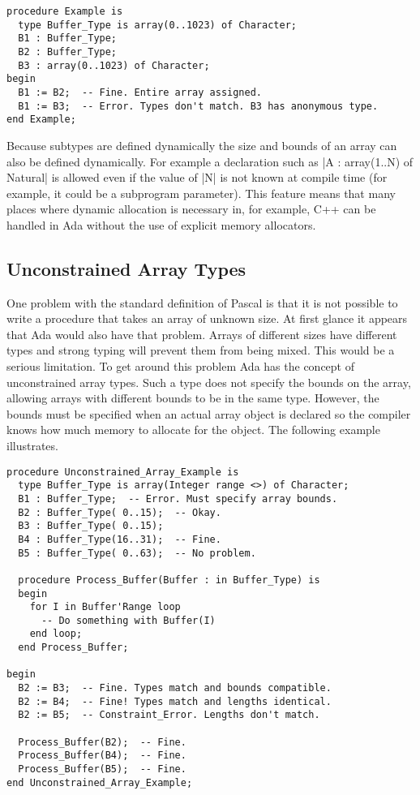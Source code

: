 \begin{lstlisting}
procedure Example is
  type Buffer_Type is array(0..1023) of Character;
  B1 : Buffer_Type;
  B2 : Buffer_Type;
  B3 : array(0..1023) of Character;
begin
  B1 := B2;  -- Fine. Entire array assigned.
  B1 := B3;  -- Error. Types don't match. B3 has anonymous type.
end Example;
\end{lstlisting}

Because subtypes are defined dynamically the size and bounds of an array can also be defined
dynamically. For example a declaration such as |A : array(1..N) of Natural| is allowed even if
the value of |N| is not known at compile time (for example, it could be a subprogram parameter).
This feature means that many places where dynamic allocation is necessary in, for example, C++
can be handled in Ada without the use of explicit memory allocators.

\subsection{Unconstrained Array Types}

One problem with the standard definition of Pascal is that it is not possible to write a
procedure that takes an array of unknown size. At first glance it appears that Ada would also
have that problem. Arrays of different sizes have different types and strong typing will prevent
them from being mixed. This would be a serious limitation. To get around this problem Ada has
the concept of unconstrained array types. Such a type does not specify the bounds on the array,
allowing arrays with different bounds to be in the same type. However, the bounds must be
specified when an actual array object is declared so the compiler knows how much memory to
allocate for the object. The following example illustrates.

\begin{lstlisting}
procedure Unconstrained_Array_Example is
  type Buffer_Type is array(Integer range <>) of Character;
  B1 : Buffer_Type;  -- Error. Must specify array bounds.
  B2 : Buffer_Type( 0..15);  -- Okay.
  B3 : Buffer_Type( 0..15);
  B4 : Buffer_Type(16..31);  -- Fine.
  B5 : Buffer_Type( 0..63);  -- No problem.

  procedure Process_Buffer(Buffer : in Buffer_Type) is
  begin
    for I in Buffer'Range loop
      -- Do something with Buffer(I)
    end loop;
  end Process_Buffer;

begin
  B2 := B3;  -- Fine. Types match and bounds compatible.
  B2 := B4;  -- Fine! Types match and lengths identical.
  B2 := B5;  -- Constraint_Error. Lengths don't match.

  Process_Buffer(B2);  -- Fine.
  Process_Buffer(B4);  -- Fine.
  Process_Buffer(B5);  -- Fine.
end Unconstrained_Array_Example;
\end{lstlisting}

